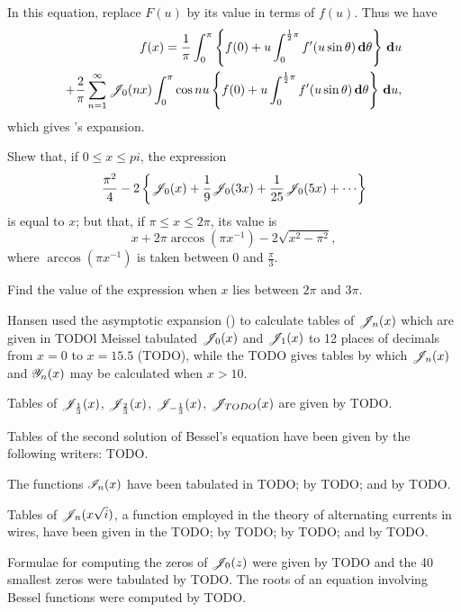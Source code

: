 In this equation, replace $F(u)$ by its value in terms of $f(u)$. Thus
we have
\begin{align*}
  f(x)
  =
  \frac{1}{\pi}
  \int_{0}^{\pi}
  \left\{ 
    f(0) + u \int_{0}^{\frac{1}{2}\pi} f'(u\sin\theta) \, \mathbf{d}\theta
   \right\}
  \, \mathbf{d} u
  \\
  +
  \frac{2}{\pi}
  \sum_{n=1}^{\infty}
  \mathscr{J}_{0}(nx)
  \int_{0}^{\pi}
  \cos nu
  \left\{ 
    f(0) + u \int_{0}^{\frac{1}{2}\pi} f'(u\sin\theta) \, \mathbf{d}\theta
   \right\}
  \, \mathbf{d} u,
\end{align*}
which gives \Schlomilch's expansion.
\begin{wandwexample}
  Shew that, if $0 \leq x \leq pi$, the expression
  $$
  \frac{\pi^{2}}{4}
  -
  2
  \thebrace{
    \besJ_{0}(x)
    + \frac{1}{9} \besJ_{0}(3x)
    + \frac{1}{25} \besJ_{0}(5x)
    + \cdots
  }
  $$
  is equal to $x$; but that, if $\pi \leq x \leq 2\pi$, its value is
  $$
  x
  +
  2\pi \arccos (\pi x^{-1})
  -
  2 \sqrt{x^{2} - \pi^{2}},
  $$
  where $\arccos(\pi x^{-1})$ is taken between $0$ and
  $\frac{\pi}{3}$.

  Find the value of the expression when $x$ lies between $2\pi$ and
  $3\pi$.
\end{wandwexample}

Hansen used the asymptotic expansion () to
calculate tables of $\mathscr{J}_{n}(x)$ which are given in TODOl
Meissel tabulated $\mathscr{J}_{0}(x)$ and $\mathscr{J}_{1}(x)$ to 12 places of
decimals from $x=0$ to $x = 15.5$ (TODO), while the TODO gives tables
by which $\mathscr{J}_{n}(x)$ and $\mathscr{Y}_{n}(x)$ may be calculated when $x >
10$.

Tables of $\mathscr{J}_{\frac{1}{3}}(x)$, $\mathscr{J}_{\frac{2}{3}}(x)$,
$\mathscr{J}_{-\frac{1}{3}}(x)$, $\mathscr{J}_{TODO}(x)$ are given by TODO.

Tables of the second solution of Bessel's equation have been given by
the following writers: TODO.

The functions $\mathscr{I}_{n}(x)$ have been tabulated in TODO; by TODO; and
by TODO.

Tables of $\mathscr{J}_{n}(x \sqrt{i})$, a function employed in the theory of
alternating currents in wires, have been given in the TODO; by TODO;
by TODO; and by TODO.

Formulae for computing the zeros of $\mathscr{J}_{0}(z)$ were given by TODO
and the 40 smallest zeros were tabulated by TODO. The roots of an
equation involving Bessel functions were computed by TODO.

